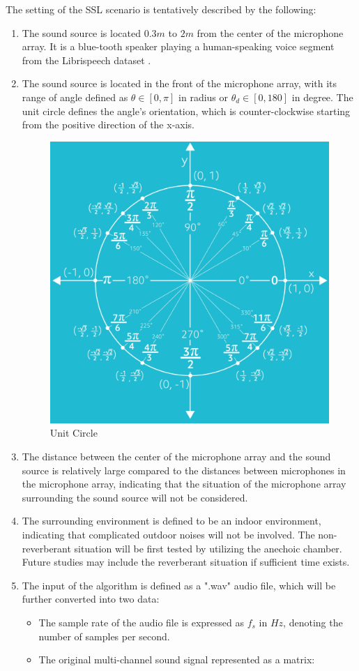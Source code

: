 The setting of the SSL scenario is tentatively described by the following:
\begin{enumerate}
    \item The sound source is located \(0.3m\) to \(2m\) from the center of the microphone array. It is a blue-tooth speaker playing a human-speaking voice segment from the Librispeech dataset \cite{panayotov_resource_2015}.
    \item The sound source is located in the front of the microphone array, with its range of angle defined as \(\theta \in [0, \pi]\) in radius or \(\theta_d \in [0, 180]\) in degree. The unit circle defines the angle's orientation, which is counter-clockwise starting from the positive direction of the x-axis.
        
    \begin{figure}[H]
        \centering
        \includegraphics[width=0.3\linewidth]{figures/Unit_circle.png}
        \caption{Unit Circle}
    \end{figure}
    \item The distance between the center of the microphone array and the sound source is relatively large compared to the distances between microphones in the microphone array, indicating that the situation of the microphone array surrounding the sound source will not be considered.
    \item The surrounding environment is defined to be an indoor environment, indicating that complicated outdoor noises will not be involved. The non-reverberant situation will be first tested by utilizing the anechoic chamber. Future studies may include the reverberant situation if sufficient time exists.
    \item The input of the algorithm is defined as a ".wav" audio file, which will be further converted into two data:
    \begin{itemize}
        \item The sample rate of the audio file is expressed as \(f_s\) in \(Hz\), denoting the number of samples per second.
        \item The original multi-channel sound signal represented as a matrix:

\end{itemize}
\end{enumerate}
